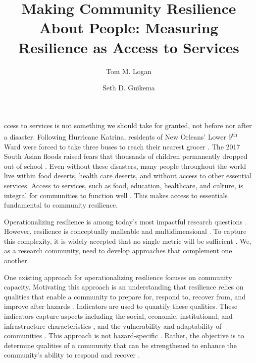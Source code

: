 \documentclass[9pt,twocolumn,twoside,lineno]{pnas-new}
\title{Making Community Resilience About People: Measuring Resilience as Access to Services} %
\author[]{Tom M. Logan}
\author{Seth D. Guikema}
\affil{Industrial and Operations Engineering, University of Michigan, Ann Arbor, USA}
\begin{document}
\maketitle
\thispagestyle{firststyle}


ccess to services is not something we should take for granted, not before nor after a disaster. Following Hurricane Katrina, residents of New Orleans' Lower 9\textsuperscript{th} Ward were forced to take three buses to reach their nearest grocer \cite{Netter2016-dm}. 
The 2017 South Asian floods raised fears that thousands of children permanently dropped out of school \cite{Watt2017-bs}. 
Even without these disasters, many people throughout the world live within food deserts, health care deserts, and without access to other essential services. 
Access to services, such as food, education, healthcare, and culture, is integral for communities to function well \cite{Winter1997-kc, Logan2017-fr, Dempsey2011-og, United_Nations_Educational_Scientific_and_Cultural_Organization2018-sf}.
This makes access to essentials fundamental to community resilience.

Operationalizing resilience is among today's most impactful research questions \cite{Caldarice2019-tv}.
However, resilience is conceptually malleable and multidimensional \cite{Caldarice2019-tv, Meerow2016-definingRes}. 
To capture this complexity, it is widely accepted that no single metric will be sufficient \cite{Bruneau2003-px, Sharma2018-rs, Haimes2009-gj, Levine2014-je, Cutter2014-jm, Cutter2016-landscape}.
We, as a research community, need to develop approaches that complement one another.

One existing approach for operationalizing resilience focuses on community capacity. 
Motivating this approach is an understanding that resilience relies on qualities that enable a community to prepare for, respond to, recover from, and improve after hazards \cite{Cutter2014-jm, Zautra2008-rb}.
Indicators are used to quantify these qualities.
These indicators capture aspects including the social, economic, institutional, and infrastructure characteristics \cite{Cutter2014-jm, Cutter2010-vg, Cutter2016-landscape, Sherrieb2010-nk}, and the vulnerability and adaptability of communities \cite{Lam2016-qn}.
This approach is not hazard-specific \cite{Koliou2018-jt}.
Rather, the objective is to determine qualities of a community that can be strengthened to enhance the community's ability to respond and recover \cite{Cutter2014-jm, Cutter2010-vg, Sherrieb2010-nk}. 
\end{document}
